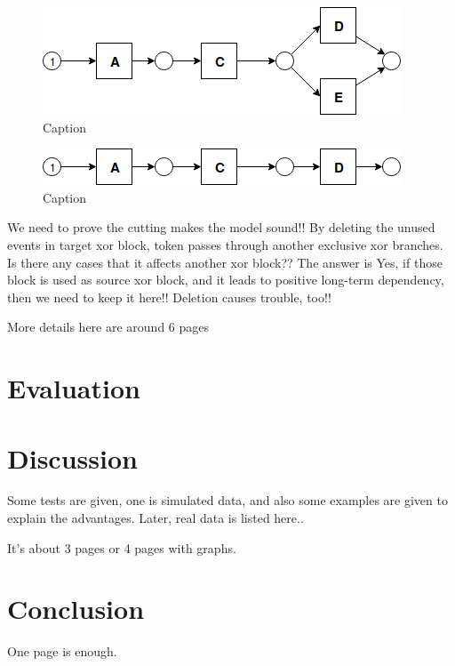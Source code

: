 \documentclass[]{article}
\begin{document}
\begin{figure}
	\centering
	\includegraphics{images/LT_Seq_01_Silent_02_AfterDeletion.png}
	\caption{Caption}
	\label{fig:seq-2-silent-5}
\end{figure}
\begin{figure}
	\centering
	\includegraphics{images/LT_Seq_01_Silent_04_AfterDeletion.png}
	\caption{Caption}
	\label{fig:seq-2-silent-6}
\end{figure}
We need to prove the cutting makes the model sound!! By deleting the unused events in target xor block, token passes through another exclusive xor branches. 
Is there any cases that it affects another xor block?? The answer is Yes, if those block is used as source xor block, and it leads to positive long-term dependency, then we need to keep it here!! Deletion causes trouble, too!!  
\fi

More details here are around 6 pages
\section{Evaluation}
\section{Discussion}


Some tests are given, one is simulated data, and also some examples are given to explain the advantages. Later, real data is listed here.. 

It's about 3 pages or 4 pages with graphs. 


\section{Conclusion}
One page is enough. 


\end{document}

